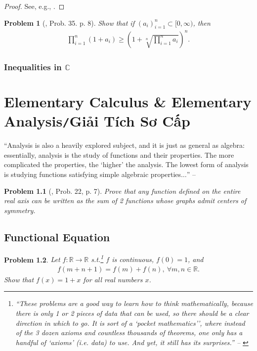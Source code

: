 \documentclass[oneside]{book}
\numberwithin{equation}{section}
\newtheorem{problem}{Problem}[section]
\begin{document}
\begin{proof}[Proof]
	See, e.g., \cite[pp. 9--10]{Gelca_Andreescu2017}.
\end{proof}

\begin{problem}[\cite{Gelca_Andreescu2017}, Prob. 35. p. 8]
	Show that if $(a_i)_{i=1}^n\subset[0,\infty)$, then
	\begin{align*}
		\prod_{i=1}^n (1 + a_i)\ge\left(1 + \sqrt[n]{\prod_{i=1}^n a_i}\right)^n.
	\end{align*}
\end{problem}

\subsection{Inequalities in $\mathbb{C}$}


\chapter{Elementary Calculus \& Elementary Analysis\texttt{/}Giải Tích Sơ Cấp}
``Analysis is also a heavily explored subject, and it is just as general as algebra: essentially, analysis is the study of functions and their properties. The more complicated the properties, the `higher' the analysis. The lowest form of analysis is studying functions satisfying simple algebraic properties$\ldots$'' -- \cite[Chap. 3, p. 36]{Tao2006}

\begin{problem}[\cite{Gelca_Andreescu2017}, Prob. 22, p. 7]
	Prove that any function defined on the entire real axis can be written as the sum of 2 functions whose graphs admit centers of symmetry.
\end{problem}

\section{Functional Equation}
\begin{problem}
	Let $f:\mathbb{R}\to\mathbb{R}$ s.t.\footnote{``These problems are a good way to learn how to think mathematically, because there is only 1 or 2 pieces of data that can be used, so there should be a clear direction in which to go. It is sort of a `pocket mathematics'’, where instead of the 3 dozen axioms and countless thousands of theorems, one only has a handful of `axioms' (i.e. data) to use. And yet, it still has its surprises.'' -- \cite[Chap. 3, p. 36]{Tao2006}} $f$ is continuous, $f(0) = 1$, and
	\begin{align*}
		f(m + n + 1) = f(m) + f(n),\ \forall m,n\in\mathbb{R}.
	\end{align*}
	Show that $f(x) = 1 + x$ for all real numbers $x$.
\end{problem}
\end{document}
